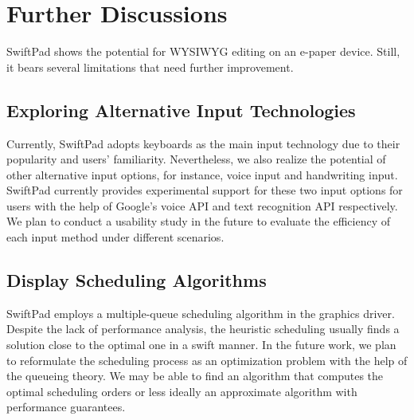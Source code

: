 \documentclass[]{sigchi}
\begin{document}





\section{Further Discussions}\label{sect:discussion}
SwiftPad shows the potential for WYSIWYG editing on an e-paper device. Still, it bears several limitations that need further improvement.

\subsection{Exploring Alternative Input Technologies}
Currently, SwiftPad adopts keyboards as the main input technology due to their popularity and users' familiarity. Nevertheless, we also realize the potential of other alternative input options, for instance, voice input and handwriting input.
SwiftPad currently provides experimental support for these two input options for users with the help of Google's voice API and text recognition API respectively. We plan to conduct a usability study in the future to evaluate the efficiency of each input method under different scenarios.

\subsection{Display Scheduling Algorithms}
SwiftPad employs a multiple-queue scheduling algorithm in the graphics driver. 
Despite the lack of performance analysis, the heuristic scheduling usually finds a solution close to the optimal one in a swift manner. 
In the future work, we plan to reformulate the scheduling process as an optimization problem with the help of the queueing theory. We may be able to find an algorithm that computes the optimal scheduling orders or less ideally an approximate algorithm with performance guarantees.
	
\end{document}
